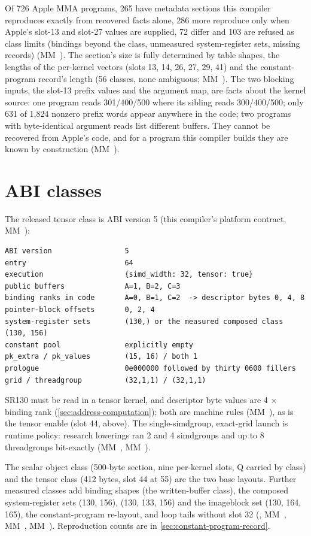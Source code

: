 Of 726 Apple MMA programs, 265 have metadata sections this compiler reproduces exactly from recovered facts alone,
286 more reproduce only when Apple's slot-13 and slot-27 values are supplied, 72 differ and 103 are
refused as class limits (bindings beyond the class, unmeasured system-register sets, missing records) (MM~). The
section's size is fully determined by table shapes, the lengths of the per-kernel vectors (slots 13, 14, 26, 27, 29, 41)
and the constant-program record's length (56 classes, none ambiguous; MM~). The two blocking inputs, the slot-13
prefix values and the argument map, are facts about the kernel source: one program reads 301/400/500 where its sibling
reads 300/400/500; only 631 of 1,824 nonzero prefix words appear anywhere in the code; two programs with byte-identical
argument reads list different buffers. They cannot be recovered from Apple's code, and for a program this compiler builds
they are known by construction (MM~).

\section{ABI classes}\label{sec:abi-classes}

The released tensor class is ABI version 5 (this compiler's platform contract, MM~):

\begin{lstlisting}
ABI version                 5
entry                       64
execution                   {simd_width: 32, tensor: true}
public buffers              A=1, B=2, C=3
binding ranks in code       A=0, B=1, C=2  -> descriptor bytes 0, 4, 8
pointer-block offsets       0, 2, 4
system-register sets        (130,) or the measured composed class (130, 156)
constant pool               explicitly empty
pk_extra / pk_values        (15, 16) / both 1
prologue                    0e000000 followed by thirty 0600 fillers
grid / threadgroup          (32,1,1) / (32,1,1)
\end{lstlisting}

SR130 must be read in a tensor kernel, and descriptor byte values are 4 $\times$ binding rank
(\cref{sec:address-computation}); both are machine rules (MM~), as is the tensor enable (slot 44, above). The single-simdgroup, exact-grid launch is runtime policy: research lowerings ran 2 and 4
simdgroups and up to 8 threadgroups bit-exactly (MM~, MM~).

The scalar object class (500-byte section, nine per-kernel slots, Q carried by class) and the tensor class (412 bytes,
slot 44 at 55) are the two base layouts. Further measured classes add binding shapes (the written-buffer class), the
composed system-register sets (130, 156), (130, 133, 156) and the imageblock set (130, 164, 165), the constant-program
re-layout, and loop tails without slot 32 (, MM~, MM~, MM~).
Reproduction counts are in \cref{sec:constant-program-record}.

